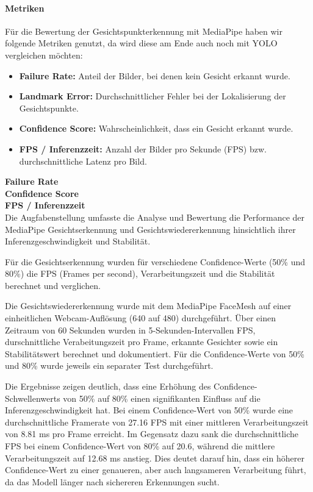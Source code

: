 \paragraph{Metriken}
Für die Bewertung der Gesichtspunkterkennung mit MediaPipe haben wir folgende Metriken genutzt, da wird diese am Ende auch noch mit YOLO vergleichen möchten:
\begin{itemize}
    \item \textbf{Failure Rate:} Anteil der Bilder, bei denen kein Gesicht erkannt wurde.
    \item \textbf{Landmark Error:} Durchschnittlicher Fehler bei der Lokalisierung der Gesichtspunkte.
    \item \textbf{Confidence Score:} Wahrscheinlichkeit, dass ein Gesicht erkannt wurde.
    \item \textbf{FPS / Inferenzzeit:} Anzahl der Bilder pro Sekunde (FPS) bzw. durchschnittliche Latenz pro Bild.
\end{itemize}


\textbf{Failure Rate} \\


\textbf{Confidence Score} \\


\textbf{FPS / Inferenzzeit} \\

Die Augfabenstellung umfasste die Analyse und Bewertung die Performance der MediaPipe Gesichtserkennung und Gesichtswiedererkennung hinsichtlich ihrer Inferenzgeschwindigkeit und Stabilität.

Für die Gesichtserkennung wurden für verschiedene Confidence-Werte (50\% und 80\%) die FPS (Frames per second), Verarbeitungszeit und die Stabilität berechnet und verglichen.

Die Gesichtswiedererkennung wurde mit dem MediaPipe FaceMesh auf einer einheitlichen Webcam-Auflösung (640 auf 480) durchgeführt. Über einen Zeitraum von 60 Sekunden wurden in 5-Sekunden-Intervallen FPS, durschnittliche Verabeitungszeit pro Frame, erkannte Gesichter sowie ein Stabilitätswert berechnet und dokumentiert.
Für die Confidence-Werte von 50\% und 80\% wurde jeweils ein separater Test durchgeführt.

Die Ergebnisse zeigen deutlich, dass eine Erhöhung des Confidence-Schwellenwerts von 50\% auf 80\% einen signifikanten Einfluss auf die Inferenzgeschwindigkeit hat. Bei einem Confidence-Wert von 50\% wurde eine durchschnittliche Framerate von 27.16 FPS mit einer mittleren Verarbeitungszeit von 8.81 ms pro Frame erreicht. Im Gegensatz dazu sank die durchschnittliche FPS bei einem Confidence-Wert von 80\% auf 20.6, während die mittlere Verarbeitungszeit auf 12.68 ms anstieg. Dies deutet darauf hin, dass ein höherer Confidence-Wert zu einer genaueren, aber auch langsameren Verarbeitung führt, da das Modell länger nach sichereren Erkennungen sucht.

